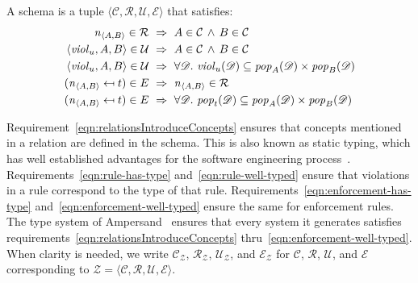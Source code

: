 \documentclass[runningheads]{llncs}
\newcommand{\id}[1]{\text{\it #1\/}}
\newcommand{\popF}[1]{\id{pop}_{#1}}
\newcommand{\pop}[2]{\popF{#1}(#2)}
\newcommand{\viol}[2]{\violC{#1}(#2)}
\newcommand{\violC}[1]{\id{viol}_{#1}}
\newcommand{\declare}[3]{\id{#1}_{\pair{#2}{#3}}}
\newcommand{\pair}[2]{\langle{#1},{#2}\rangle}
\newcommand{\Pair}[2]{#1\times#2}
\newcommand{\triple}[3]{\langle{#1},{#2},{#3}\rangle}
\newcommand{\quadruple}[4]{\langle{#1},{#2},{#3},{#4}\rangle}
\newcommand{\concepts}{\mathcal{C}}
\newcommand{\rels}{\mathcal{R}}   %
\newcommand{\enforces}{\mathcal{E}}
\newcommand{\rules}{\mathcal{U}}
\newcommand{\dataset}{\mathscr{D}}
\newcommand{\schema}{\mathscr{Z}}
\begin{document}
   \begin{definition}[Schema]
   A schema is a tuple $\quadruple{\concepts}{\rels}{\rules}{\enforces}$ that satisfies:
\begin{align}
   \declare{n}{A}{B}\in\rels&~\Rightarrow~ A\in\concepts\,\wedge\, B\in\concepts
   \label{eqn:relationsIntroduceConcepts}\\
   \triple{\violC{u}}{A}{B}\in\rules&~\Rightarrow~A\in\concepts\,\wedge\, B\in\concepts\label{eqn:rule-has-type}\\
   \triple{\violC{u}}{A}{B}\in\rules&~\Rightarrow~\forall\dataset.\ \viol{u}{\dataset}\subseteq\Pair{\pop{A}{\dataset}}{\pop{B}{\dataset}}\label{eqn:rule-well-typed}\\
   (\declare{n}{A}{B}\mapsfrom t)\in\mathcal\enforces&~\Rightarrow~ \declare{n}{A}{B}\in \rels\label{eqn:enforcement-has-type}\\
   (\declare{n}{A}{B}\mapsfrom t)\in\mathcal\enforces&~\Rightarrow~\forall\dataset.\ \pop{t}{\dataset}\subseteq\Pair{\pop{A}{\dataset}}{\pop{B}{\dataset}}\label{eqn:enforcement-well-typed}
\end{align}
   \end{definition}
   Requirement~\ref{eqn:relationsIntroduceConcepts} ensures that concepts mentioned in a relation are defined in the schema.
   This is also known as static typing, which has well established advantages for the software engineering process~\cite{HanenbergKRTS14,Petersen2014}.
   Requirements~\ref{eqn:rule-has-type} and~\ref{eqn:rule-well-typed} ensure that violations in a rule correspond to the type of that rule. 
   Requirements~\ref{eqn:enforcement-has-type} and~\ref{eqn:enforcement-well-typed} ensure the same for enforcement rules. 
   The type system of Ampersand~\cite{vdWoude2011} ensures that every system it generates satisfies requirements~\ref{eqn:relationsIntroduceConcepts} thru~\ref{eqn:enforcement-well-typed}.
   When clarity is needed, we write $\concepts_{\schema}$, $\rels_{\schema}$, $\rules_{\schema}$, and $\enforces_{\schema}$
   for $\concepts$, $\rels$, $\rules$, and $\enforces$ corresponding to $\schema = \quadruple{\concepts}{\rels}{\rules}{\enforces}$.
\end{document}
